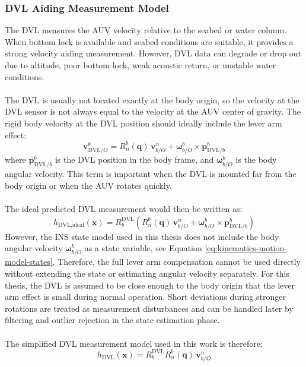 \subsubsection{DVL Aiding Measurement Model}
The DVL measures the AUV velocity relative to the seabed or water column. When bottom lock is available and seabed conditions are suitable, it provides a strong velocity aiding measurement. However, DVL data can degrade or drop out due to altitude, poor bottom lock, weak acoustic return, or unstable water conditions.
\\ \\
The DVL is usually not located exactly at the body origin, so the velocity at the DVL sensor is not always equal to the velocity at the AUV center of gravity. The rigid body velocity at the DVL position should ideally include the lever arm effect:
$$
    \mathbf{v}_{\text{DVL}/O}^{b}
    =
    R_n^b(\mathbf{q})\,\mathbf{v}_{b/O}^{n}
    +
    \boldsymbol{\omega}_{b/O}^{b} \times \mathbf{p}_{\text{DVL}/b}^{b}
$$
where $\mathbf{p}_{\text{DVL}/b}^{b}$ is the DVL position in the body frame, and $\boldsymbol{\omega}_{b/O}^{b}$ is the body angular velocity. This term is important when the DVL is mounted far from the body origin or when the AUV rotates quickly.
\\ \\
The ideal predicted DVL measurement would then be written as:
$$
    h_{\text{DVL,ideal}}(\mathbf{x}) =
    R_b^{\text{DVL}}
    \left(
        R_n^b(\mathbf{q})\,\mathbf{v}_{b/O}^{n}
        +
        \boldsymbol{\omega}_{b/O}^{b} \times \mathbf{p}_{\text{DVL}/b}^{b}
    \right)
$$
However, the INS state model used in this thesis does not include the body angular velocity $\boldsymbol{\omega}_{b/O}^{b}$ as a state variable, see Equation \ref{eq:kinematics-motion-model-states}. Therefore, the full lever arm compensation cannot be used directly without extending the state or estimating angular velocity separately. For this thesis, the DVL is assumed to be close enough to the body origin that the lever arm effect is small during normal operation. Short deviations during stronger rotations are treated as measurement disturbances and can be handled later by filtering and outlier rejection in the state estimation phase.
\\ \\
The simplified DVL measurement model used in this work is therefore:
\begin{equation}
    h_{\text{DVL}}(\mathbf{x}) =
    R_b^{\text{DVL}} R_n^b(\mathbf{q})\,\mathbf{v}_{b/O}^{n}
    \label{eq:aiding-measurement-model-dvl}
\end{equation}
